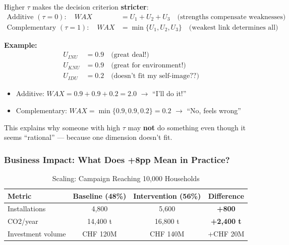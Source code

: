 \begin{proposition}
Higher $\tau$ makes the decision criterion \textbf{stricter}:
\begin{align}
\text{Additive } (\tau = 0): \quad WAX &= U_1 + U_2 + U_3 \quad \text{(strengths compensate weaknesses)} \\
\text{Complementary } (\tau = 1): \quad WAX &= \min\{U_1, U_2, U_3\} \quad \text{(weakest link determines all)}
\end{align}
\end{proposition}

\textbf{Example:}
\begin{align*}
U_{INU} &= 0.9 \quad \text{(great deal!)} \\
U_{KNU} &= 0.9 \quad \text{(great for environment!)} \\
U_{IDU} &= 0.2 \quad \text{(doesn't fit my self-image??)}
\end{align*}

\begin{itemize}
\item Additive: $WAX = 0.9 + 0.9 + 0.2 = 2.0$ $\rightarrow$ ``I'll do it!''
\item Complementary: $WAX = \min\{0.9, 0.9, 0.2\} = 0.2$ $\rightarrow$ ``No, feels wrong''
\end{itemize}

This explains why someone with high $\tau$ may \textbf{not} do something even though it seems ``rational'' --- because one dimension doesn't fit.

\subsubsection{Business Impact: What Does +8pp Mean in Practice?}

\begin{table}[htbp]
\centering
\caption{Scaling: Campaign Reaching 10,000 Households}
\begin{tabular}{@{}lccc@{}}
\toprule
\textbf{Metric} & \textbf{Baseline (48\%)} & \textbf{Intervention (56\%)} & \textbf{Difference} \\
\midrule
Installations & 4,800 & 5,600 & \textbf{+800} \\
CO2/year & 14,400 t & 16,800 t & \textbf{+2,400 t} \\
Investment volume & CHF 120M & CHF 140M & +CHF 20M \\
\bottomrule
\end{tabular}
\end{table}

